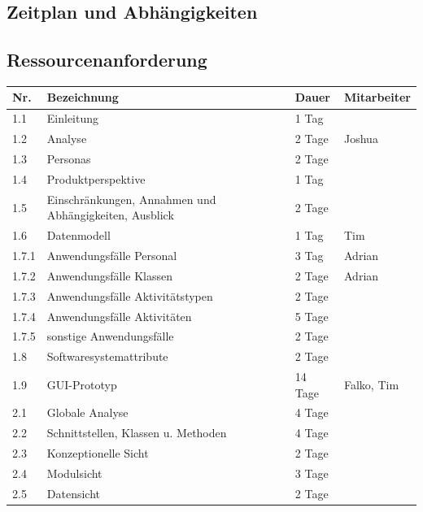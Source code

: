 \documentclass[fontsize=12pt,paper=a4,twoside]{scrartcl}
\begin{document}
\subsection{Zeitplan und Abhängigkeiten}


\subsection{Ressourcenanforderung}

\begin{tabularx}{\textwidth}{|p{1cm}|p{5.5cm}|p{2cm}|X|}
\hline \textbf{Nr.} &\textbf{Bezeichnung} & \textbf{Dauer} & \textbf{Mitarbeiter} \\
\hline 		1.1		& Einleitung							&	1 Tag		& \\
\hline 		1.2 	& Analyse		                		&	2 Tage		& Joshua\\
\hline 		1.3 	& Personas	                    		&   2 Tage      &  \\
\hline 		1.4		& Produktperspektive					&	1 Tag		& \\
\hline 		1.5		& Einschränkungen, Annahmen und Abhängigkeiten, Ausblick & 2 Tage &\\
\hline 		1.6 	& Datenmodell	                		&   1 Tag       & Tim\\
\hline 		1.7.1 	& Anwendungsfälle Personal      		&   3 Tag	    & Adrian \\
\hline 		1.7.2 	& Anwendungsfälle Klassen       		&   2 Tage      & Adrian \\
\hline 		1.7.3 	& Anwendungsfälle Aktivitätstypen		&	2 Tage		&  \\
\hline 		1.7.4 	& Anwendungsfälle Aktivitäten			&	5 Tage		&  \\
\hline 		1.7.5	& sonstige Anwendungsfälle      		&	2 Tage		&  \\
\hline 		1.8		& Softwaresystemattribute       		&	2 Tage	    &  \\
\hline 		1.9 	& GUI-Prototyp                  		&	14 Tage		& Falko, Tim \\
\hline		2.1		& Globale Analyse						&	4 Tage		&  \\
\hline 		2.2		& Schnittstellen, Klassen u. Methoden 	& 	4 Tage		&  \\
\hline 		2.3		& Konzeptionelle Sicht					& 	2 Tage		&  \\
\hline		2.4		& Modulsicht							&   3 Tage		&  \\
\hline 		2.5		& Datensicht							& 	2 Tage		&  \\

\end{tabularx}
\end{document}
